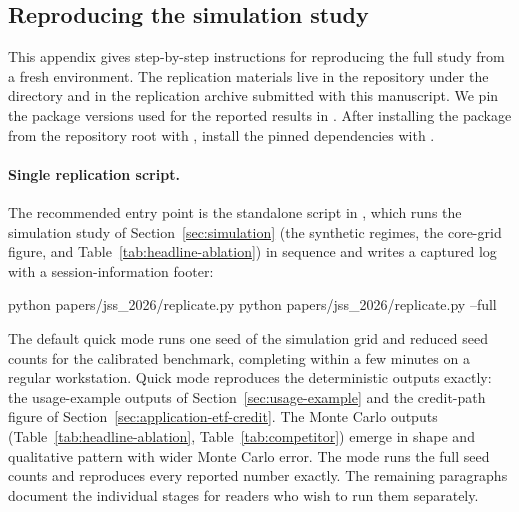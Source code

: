 \documentclass[article]{jss}
\begin{document}
\begin{appendix}

\section[Reproducing the simulation study]{Reproducing the simulation study}
\label{app:reproduction}

This appendix gives step-by-step instructions for reproducing the full
study from a fresh  environment.
The replication materials live in the  repository
under the  directory and in the replication
archive submitted with this manuscript. We
pin the package versions used for the reported results in
. After installing the package from
the repository root with , install the pinned
dependencies with .





\paragraph{Single replication script.}
{\sloppy
	The recommended entry point is the standalone script
	 in , which runs the simulation study of
	Section~\ref{sec:simulation} (the synthetic regimes, the core-grid
	figure, and Table~\ref{tab:headline-ablation}) in sequence and writes
	a captured log with a session-information footer:\par}
%
\begin{CodeChunk}
	\begin{CodeInput}
python papers/jss_2026/replicate.py
python papers/jss_2026/replicate.py --full
	\end{CodeInput}
\end{CodeChunk}
%
The default quick mode runs one seed of the simulation grid and reduced
seed counts for the calibrated benchmark, completing within a few
minutes on a regular workstation. Quick mode reproduces the deterministic outputs
exactly: the usage-example outputs of Section~\ref{sec:usage-example} and the
credit-path figure of Section~\ref{sec:application-etf-credit}. The Monte Carlo outputs (Table~\ref{tab:headline-ablation},
Table~\ref{tab:competitor}) emerge in shape and qualitative pattern with
wider Monte Carlo error. The
 mode runs the full seed counts and reproduces every
reported number exactly. The remaining paragraphs document the
individual stages for readers who wish to run them separately.


\end{appendix}
\end{document}
